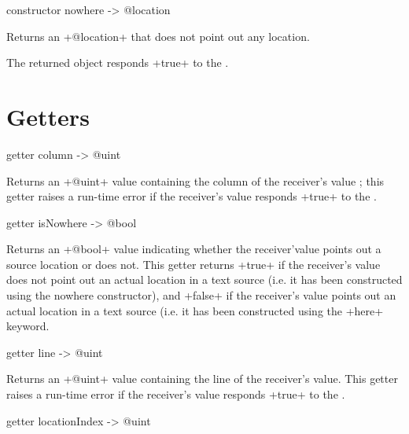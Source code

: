 
\begin{galgas}
constructor nowhere -> @location
\end{galgas}


Returns an \ggs+@location+ that does not point out any location.

The returned object responds \ggs+true+ to the .

\section{Getters}


\begin{galgas}
getter column -> @uint
\end{galgas}

Returns an \ggs+@uint+ value containing the column of the receiver's value ; this getter raises a run-time error if the receiver's value responds \ggs+true+ to the .



\begin{galgas}
getter isNowhere -> @bool
\end{galgas}

Returns an \ggs+@bool+ value indicating whether the receiver'value points out a source location or does not. This getter returns \ggs+true+ if the receiver's value does not point out an actual location in a text source (i.e. it has been constructed using the nowhere constructor), and \ggs+false+ if the receiver's value points out an actual location in a text source (i.e. it has been constructed using the \ggs+here+ keyword.



\begin{galgas}
getter line -> @uint
\end{galgas}

Returns an \ggs+@uint+ value containing the line of the receiver's value. This getter raises a run-time error if the receiver's value responds \ggs+true+ to the .



\begin{galgas}
getter locationIndex -> @uint
\end{galgas}

